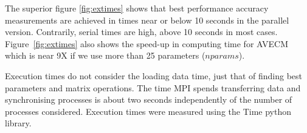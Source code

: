 The superior figure \ref{fig:extimes} shows that best performance accuracy measurements are
achieved in times near or below 10 seconds in the parallel version. Contrarily,
serial times are high, above 10 seconds in most cases. Figure~\ref{fig:extimes} also shows the speed-up in computing time for AVECM which is near 9X if we use more than 25 parameters ($nparams$).

Execution times do not consider the loading data time, just that of finding
best parameters and matrix operations. The time MPI spends
transferring data and synchronising processes is about two seconds independently
of the number of processes considered. Execution times were measured using the Time python library.

